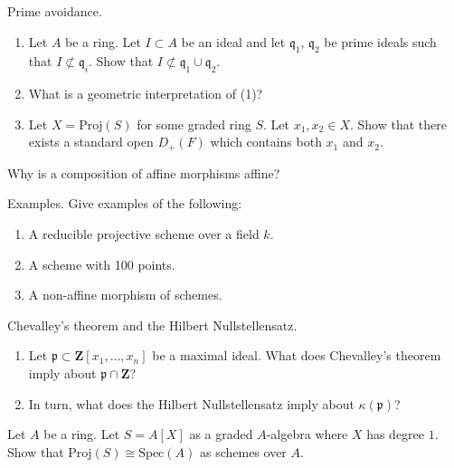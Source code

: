 \begin{exercise}
\label{exercise-prime-avoidance}
Prime avoidance.
\begin{enumerate}
\item Let $A$ be a ring. Let $I \subset A$ be an ideal and
let $\mathfrak q_1$, $\mathfrak q_2$ be prime ideals such that
$I \not \subset \mathfrak q_i$. Show that
$I \not \subset \mathfrak q_1 \cup \mathfrak q_2$.
\item What is a geometric interpretation of (1)?
\item Let $X = \text{Proj}(S)$ for some graded ring $S$.
Let $x_1, x_2 \in X$. Show that there exists a standard open
$D_{+}(F)$ which contains both $x_1$ and $x_2$.
\end{enumerate}
\end{exercise}

\begin{exercise}
\label{exercise-compose-affine}
Why is a composition of affine morphisms affine?
\end{exercise}

\begin{exercise}
\label{exercise-examples}
Examples. Give examples of the following:
\begin{enumerate}
\item A reducible projective scheme over a field $k$.
\item A scheme with 100 points.
\item A non-affine morphism of schemes.
\end{enumerate}
\end{exercise}

\begin{exercise}
\label{exercise-chevalley-hilbert-nullstellensatz}
Chevalley's theorem and the Hilbert Nullstellensatz.
\begin{enumerate}
\item Let $\mathfrak p \subset \mathbf{Z}[x_1, \ldots, x_n]$
be a maximal ideal. What does Chevalley's theorem imply about
$\mathfrak p \cap \mathbf{Z}$?
\item In turn, what does the Hilbert Nullstellensatz imply about
$\kappa(\mathfrak p)$?
\end{enumerate}
\end{exercise}

\begin{exercise}
\label{exercise-P0}
Let $A$ be a ring. Let $S = A[X]$ as a graded $A$-algebra
where $X$ has degree $1$. Show that $\text{Proj}(S) \cong \text{Spec}(A)$
as schemes over $A$.
\end{exercise}

